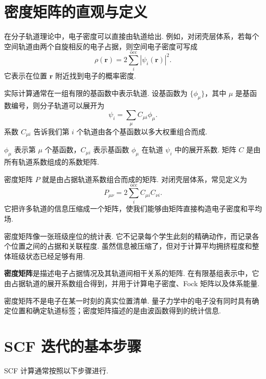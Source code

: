 \documentclass[UTF8,11pt,a4paper,openany]{ctexbook}
\newcommand{\term}[1]{\textbf{#1}}
\begin{document}
\section{密度矩阵的直观与定义}

在分子轨道理论中，电子密度可以直接由轨道给出. 例如，对闭壳层体系，若每个空间轨道由两个自旋相反的电子占据，则空间电子密度可写成
\[
\rho(\mathbf r)
=
2\sum_i^{\mathrm{occ}}
|\psi_i(\mathbf r)|^2.
\]
它表示在位置 $\mathbf r$ 附近找到电子的概率密度. 

实际计算通常在一组有限的基函数中表示轨道. 设基函数为 $\{\phi_\mu\}$，其中 $\mu$ 是基函数编号，则分子轨道可以展开为
\[
\psi_i=\sum_\mu C_{\mu i}\phi_\mu.
\]
系数 $C_{\mu i}$ 告诉我们第 $i$ 个轨道由各个基函数以多大权重组合而成. 

\begin{notationbox}
$\phi_\mu$ 表示第 $\mu$ 个基函数，$C_{\mu i}$ 表示基函数 $\phi_\mu$ 在轨道 $\psi_i$ 中的展开系数. 矩阵 $C$ 是由所有轨道系数组成的系数矩阵. 
\end{notationbox}

密度矩阵 $P$ 就是由占据轨道系数组合而成的矩阵. 对闭壳层体系，常见定义为
\[
P_{\mu\nu}
=
2\sum_i^{\mathrm{occ}}
C_{\mu i}C_{\nu i}.
\]
它把许多轨道的信息压缩成一个矩阵，使我们能够由矩阵直接构造电子密度和平均场. 

\begin{analogybox}
密度矩阵像一张班级座位的统计表. 它不记录每个学生此刻的精确动作，而记录各个位置之间的占据和关联程度. 虽然信息被压缩了，但对于计算平均拥挤程度和整体班级状态已经足够有用. 
\end{analogybox}

\begin{definitionbox}
\term{密度矩阵}是描述电子占据情况及其轨道间相干关系的矩阵. 在有限基组表示中，它由占据轨道的展开系数组合得到，并用于计算电子密度、Fock 矩阵以及体系能量. 
\end{definitionbox}

\begin{limitbox}
密度矩阵不是电子在某一时刻的真实位置清单. 量子力学中的电子没有同时具有确定位置和确定轨道标签；密度矩阵描述的是由波函数得到的统计信息. 
\end{limitbox}

\section{SCF 迭代的基本步骤}

SCF 计算通常按照以下步骤进行. 
\end{document}
